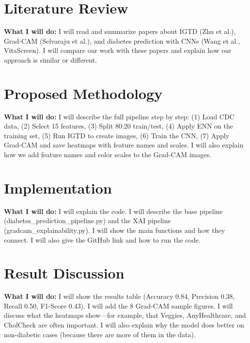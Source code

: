 \documentclass[12pt]{dalthesis}
\begin{document}
\chapter{Literature Review}\label{ch:lit}

\textbf{What I will do:} I will read and summarize papers about IGTD (Zhu et al.), Grad-CAM (Selvaraju et al.), and diabetes prediction with CNNs (Wang et al., VitaScreen). I will compare our work with these papers and explain how our approach is similar or different.


\chapter{Proposed Methodology}\label{ch:method}

\textbf{What I will do:} I will describe the full pipeline step by step: (1) Load CDC data, (2) Select 15 features, (3) Split 80:20 train/test, (4) Apply ENN on the training set, (5) Run IGTD to create images, (6) Train the CNN, (7) Apply Grad-CAM and save heatmaps with feature names and scales. I will also explain how we add feature names and color scales to the Grad-CAM images.


\chapter{Implementation}\label{ch:impl}

\textbf{What I will do:} I will explain the code. I will describe the base pipeline (diabetes\_prediction\_pipeline.py) and the XAI pipeline (gradcam\_explainability.py). I will show the main functions and how they connect. I will also give the GitHub link and how to run the code.


\chapter{Result Discussion}\label{ch:results}

\textbf{What I will do:} I will show the results table (Accuracy 0.84, Precision 0.38, Recall 0.50, F1-Score 0.43). I will add the 8 Grad-CAM sample figures. I will discuss what the heatmaps show—for example, that Veggies, AnyHealthcare, and CholCheck are often important. I will also explain why the model does better on non-diabetic cases (because there are more of them in the data).
\end{document}
